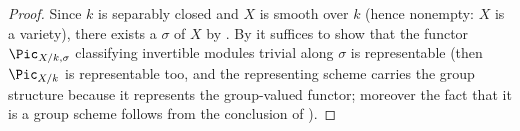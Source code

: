 \begin{proof}
Since $k$ is separably closed and $X$ is smooth over $k$ (hence nonempty:
$X$ is a variety), there exists a
 $\sigma$ of $X$ by
.  By  it
suffices to show that the functor
$\Pic_{X/k,\sigma}$ classifying invertible modules trivial along
$\sigma$ is representable (then $\Pic_{X/k}$ is representable too, and
the representing scheme carries the group structure because it represents
the group-valued functor; moreover the fact that it is a group scheme
follows from the conclusion of ).


\end{proof}

